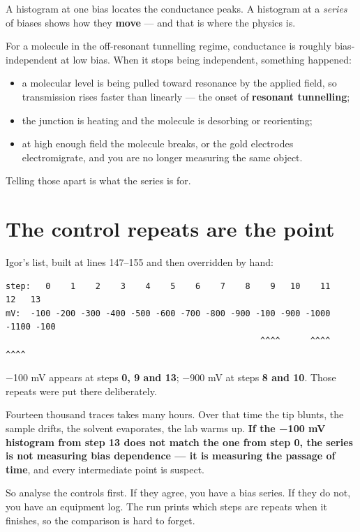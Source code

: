 A histogram at one bias locates the conductance peaks. A histogram at a \emph{series} of biases shows how they \textbf{move} --- and that is where the physics is.

For a molecule in the off-resonant tunnelling regime, conductance is roughly bias-independent at low bias. When it stops being independent, something happened:

\begin{itemize}[leftmargin=*]
\item a molecular level is being pulled toward resonance by the applied field, so transmission rises faster than linearly --- the onset of \textbf{resonant tunnelling};
\item the junction is heating and the molecule is desorbing or reorienting;
\item at high enough field the molecule breaks, or the gold electrodes electromigrate, and you are no longer measuring the same object.
\end{itemize}

Telling those apart is what the series is for.

\section{The control repeats are the point}

Igor's list, built at lines 147--155 and then overridden by hand:

\begin{lstlisting}[style=out]
step:   0    1    2    3    4    5    6    7    8    9   10    11    12   13
mV:  -100 -200 -300 -400 -500 -600 -700 -800 -900 -100 -900 -1000 -1100 -100
                                                   ^^^^      ^^^^        ^^^^
\end{lstlisting}

−100 mV appears at steps \textbf{0, 9 and 13}; −900 mV at steps \textbf{8 and 10}. Those repeats were put there deliberately.

Fourteen thousand traces takes many hours. Over that time the tip blunts, the sample drifts, the solvent evaporates, the lab warms up. \textbf{If the −100 mV histogram from step 13 does not match the one from step 0, the series is not measuring bias dependence --- it is measuring the passage of time}, and every intermediate point is suspect.

So analyse the controls first. If they agree, you have a bias series. If they do not, you have an equipment log. The run prints which steps are repeats when it finishes, so the comparison is hard to forget.

